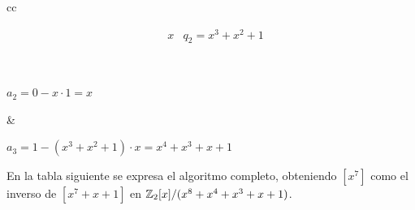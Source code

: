 \begin{ejs}
\begin{center}
\begin{tabular}{cc}
\begin{minipage}[t]{0.48\textwidth}
\[\begin{array}{rl|l}
                            &x &  q_2 = x^3 + x^2 + 1
                        \end{array}
                    \]
                \end{minipage}\\
                \hspace{-3em}
                \begin{minipage}[t]{0.45\textwidth}
                    \vspace{0.5em}
                    \centering
                    $a_2 =  0 - x\cdot 1 = x$
                \end{minipage}
                \hspace{-0.5em}
                &
                \begin{minipage}[t]{0.48\textwidth}
                    \vspace{0.35em}
                    \centering
                    $a_3 = 1 - (x^3 + x^2 + 1)\cdot x = x^4 + x^3 + x + 1$
                \end{minipage}
            \end{tabular}
        \end{center}
        
        En la tabla siguiente se expresa el algoritmo completo, obteniendo $[x^7]$ como el inverso de $[x^7 + x + 1]$ en $\mathbb{Z}_2[x]/(x^8 + x^4 + x^3 + x + 1)$.
      

\end{ejs}
